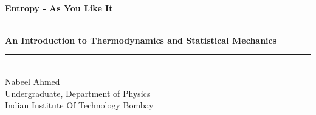 \documentclass[oneside]{book}
\begin{document}
\pagestyle{fancy}


\begin{titlepage}
\begin{flushleft}
	

\vspace*{5cm}

\textsf{\fontsize{35}{00} \textbf{\\Entropy - As You Like It} }
   
\vspace{0.5cm}

\textsf{\fontsize{20}{00} \textbf{\\An Introduction to Thermodynamics and Statistical Mechanics}}
\vspace{0.6cm}
\hrule
   
\vspace{0.4cm}
 \Large
\textsf{\\  Nabeel Ahmed
 \\Undergraduate, Department of Physics
\\Indian Institute Of Technology Bombay}   

      
\end{flushleft}
\end{titlepage}
\end{document}
